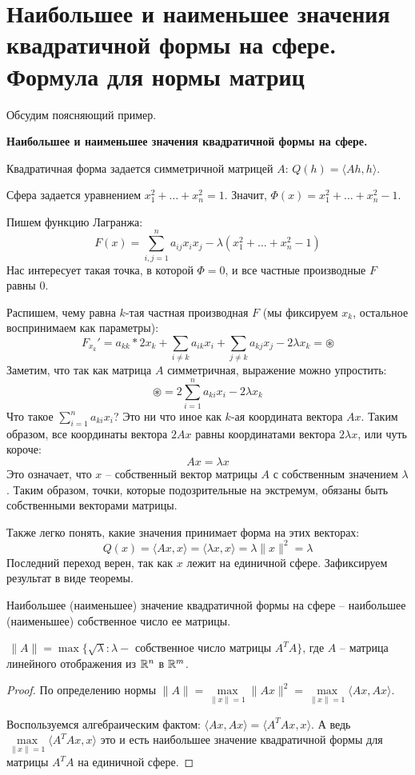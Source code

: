 \section{Наибольшее и наименьшее значения квадратичной формы на сфере. Формула для нормы матриц}
Обсудим поясняющий пример.

\textbf{Наибольшее и наименьшее значения квадратичной формы на сфере.}

    Квадратичная форма задается симметричной матрицей $A$: $Q(h) = \langle Ah, h \rangle$.

    Сфера задается уравнением $x_1^2 + \dots + x_n^2 = 1$.
    Значит, $\Phi(x) = x_1^2 + \dots + x_n^2 - 1$.

    Пишем функцию Лагранжа: \[ F(x) = \sum_{i, j = 1}^n a_{ij}x_ix_j - \lambda(x_1^2 + \dots + x_n^2 - 1) \]
    Нас интересует такая точка, в которой $\Phi = 0$, и все частные производные $F$ равны 0.

    Распишем, чему равна $k$-тая частная производная $F$ (мы фиксируем $x_k$, остальное воспринимаем как параметры): \[ F_{x_k}' = a_{kk}*2x_k + \sum_{i\neq k} a_{ik}x_i + \sum_{j \neq k} a_{kj}x_j -2\lambda x_k = \circledast \]
    Заметим, что так как матрица $A$ симметричная, выражение можно упростить: \[ \circledast = 2\sum_{i = 1}^n a_{ki}x_i - 2\lambda x_k \]
    Что такое $\sum\limits_{i = 1}^n a_{ki}x_i$? 
    Это ни что иное как $k$-ая координата вектора $Ax$. 
    Таким образом, все координаты вектора $2Ax$ равны координатами вектора $2\lambda x$, или чуть короче: \[ Ax = \lambda x \]
    Это означает, что $x$ -- собственный вектор матрицы $A$ с собственным значением $\lambda$.
    Таким образом, точки, которые подозрительные на экстремум, обязаны быть собственными векторами матрицы.
    
    Также легко понять, какие значения принимает форма на этих векторах: \[ Q(x) = \langle Ax, x \rangle = \langle \lambda x, x \rangle = \lambda \| x \|^2 = \lambda  \]
    Последний переход верен, так как $x$ лежит на единичной сфере.
    Зафиксируем результат в виде теоремы.

\begin{theorem}
    Наибольшее (наименьшее) значение квадратичной формы на сфере -- наибольшее (наименьшее) собственное число ее матрицы.
\end{theorem}

\vspace*{5mm}

\follow $\, \| A \| = \max \{ \sqrt{\lambda} : \lambda - \text{ собственное число матрицы } A^TA \}$, где $A$ -- матрица линейного отображения из $\mathbb{R}^n$ в $\mathbb{R}^m$.
\begin{proof}
    По определению нормы $\|A\| = \max\limits_{\|x\| = 1} \|Ax\|^2 = \max\limits_{\|x\| = 1} \langle Ax, Ax \rangle$.
    
    Воспользуемся алгебраическим фактом: $\langle Ax, Ax \rangle = \langle A^TAx, x \rangle$.
    А ведь $\max\limits_{\|x\| = 1} \langle A^TAx, x \rangle$ это и есть наибольшее значение квадратичной формы для матрицы $A^TA$ на единичной сфере.
\end{proof}
